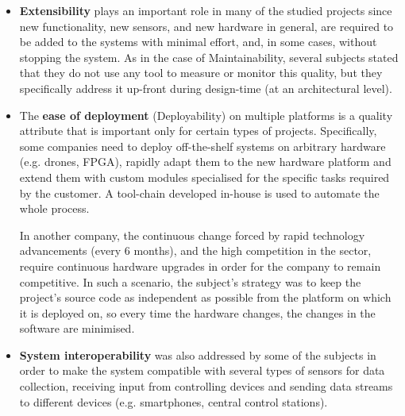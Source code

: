 \begin{itemize}
    \item \textbf{Extensibility} plays an important role in many of the studied projects since new functionality, new sensors, and new hardware in general, are required to be added to the systems with minimal effort, and, in some cases, without stopping the system.
    As in the case of Maintainability, several subjects stated that they do not use any tool to measure or monitor this quality, but they specifically address it up-front during design-time (at an architectural level).

    \item The \textbf{ease of deployment} (Deployability) on multiple platforms is a quality attribute that is important only for certain types of projects.
    Specifically, some companies need to deploy off-the-shelf systems on arbitrary hardware (e.g. drones, FPGA), rapidly adapt them to the new hardware platform and extend them with custom modules specialised for the specific tasks required by the customer.
    A tool-chain developed in-house is used to automate the whole process.
    
    In another company, the continuous change forced by rapid technology advancements (every 6 months), and the high competition in the sector, require continuous hardware upgrades in order for the company to remain competitive.
    In such a scenario, the subject's strategy was to keep the project’s source code as independent as possible from the platform on which it is deployed on, so every time the hardware changes, the changes in the software are minimised.

    \item \textbf{System interoperability} was also addressed by some of the subjects in order to make the system compatible with several types of sensors for data collection, receiving input from controlling devices and sending data streams to different devices (e.g. smartphones, central control stations).
\end{itemize}

